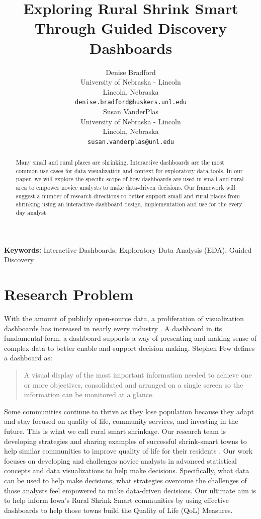 \documentclass[10pt]{article}\usepackage[]{graphicx}\usepackage[]{color}
\title{Exploring Rural Shrink Smart Through Guided Discovery Dashboards}
\author{
  Denise Bradford \\
  University of Nebraska - Lincoln \\
  Lincoln, Nebraska \\
  {\tt denise.bradford@huskers.unl.edu} \\\And
  Susan VanderPlas \\
  University of Nebraska - Lincoln \\
  Lincoln, Nebraska \\
  {\tt susan.vanderplas@unl.edu} \\}
\date{}
\begin{document}
\maketitle
\begin{abstract}
Many small and rural places are shrinking. Interactive dashboards are the most common use cases for data visualization and context for exploratory data tools. In our paper, we will explore the specific scope of how dashboards are used in small and rural area to empower novice analysts to make data-driven decisions. Our framework will suggest a number of research directions to better support small and rural places from shrinking using an interactive dashboard design, implementation and use for the every day analyst. 
\end{abstract}

{\bf Keywords:} Interactive Dashboards, Exploratory Data Analysis (EDA), Guided Discovery

\section{Research Problem}
With the amount of publicly open-source data, a proliferation of visualization dashboards has increased in nearly every industry \cite{fisher}. A dashboard in its fundamental form, a dashboard supports a way of presenting and making sense of complex data to better enable and support decision making. Stephen Few defines a dashboard as:

\begin{quotation}
\small A visual display of the most important information needed to achieve one or more objectives, consolidated and arranged on a single screen so the information can be monitored at a glance. \cite{few}
\end{quotation}

Some communities continue to thrive as they lose population because they adapt and stay focused on quality of life, community services, and investing in the future. This is what we call rural smart shrinkage. Our research team is developing strategies and sharing examples of successful shrink-smart towns to help similar communities to improve quality of life for their residents \cite{scc}. Our work focuses on developing and challenges novice analysts in advanced statistical concepts and data visualizations to help make decisions. Specifically, what data can be used to help make decisions, what strategies overcome the challenges of those analysts feel empowered to make data-driven decisions. Our ultimate aim is to help inform Iowa's Rural Shrink Smart communities by using effective dashboards to help those towns build the Quality of Life (QoL) Measures.
\end{document}

